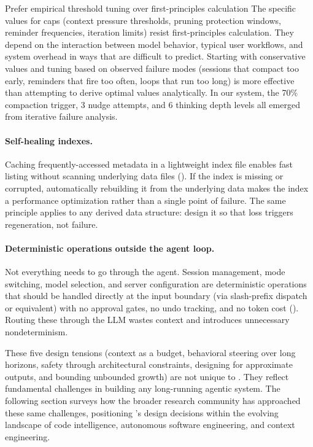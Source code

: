 \begin{lessonbox}{Prefer empirical threshold tuning over first-principles calculation}
The specific values for caps (context pressure thresholds, pruning protection windows, reminder frequencies, iteration limits) resist first-principles calculation. They depend on the interaction between model behavior, typical user workflows, and system overhead in ways that are difficult to predict. Starting with conservative values and tuning based on observed failure modes (sessions that compact too early, reminders that fire too often, loops that run too long) is more effective than attempting to derive optimal values analytically. In our system, the 70\% compaction trigger, 3 nudge attempts, and 6 thinking depth levels all emerged from iterative failure analysis.
\end{lessonbox}

\paragraph{Self-healing indexes.} Caching frequently-accessed metadata in a lightweight index file enables fast listing without scanning underlying data files (). If the index is missing or corrupted, automatically rebuilding it from the underlying data makes the index a performance optimization rather than a single point of failure. The same principle applies to any derived data structure: design it so that loss triggers regeneration, not failure.

\paragraph{Deterministic operations outside the agent loop.} Not everything needs to go through the agent. Session management, mode switching, model selection, and server configuration are deterministic operations that should be handled directly at the input boundary (via slash-prefix dispatch or equivalent) with no approval gates, no undo tracking, and no token cost (). Routing these through the LLM wastes context and introduces unnecessary nondeterminism.

\medskip
\noindent These five design tensions (context as a budget, behavioral steering over long horizons, safety through architectural constraints, designing for approximate outputs, and bounding unbounded growth) are not unique to \name. They reflect fundamental challenges in building any long-running agentic system. The following section surveys how the broader research community has approached these same challenges, positioning \name's design decisions within the evolving landscape of code intelligence, autonomous software engineering, and context engineering.
